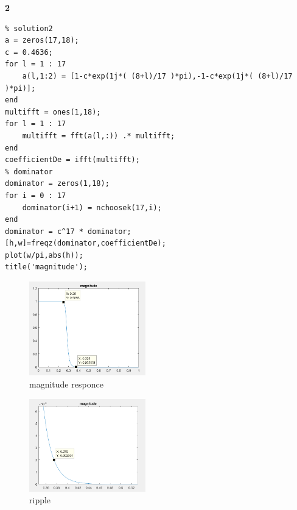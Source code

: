 \documentclass[twoside]{article}
\begin{document}
\thispagestyle{fancy} %
\noindent \textbf {2}
\begin{lstlisting}
% solution2
a = zeros(17,18);
c = 0.4636;
for l = 1 : 17
    a(l,1:2) = [1-c*exp(1j*( (8+l)/17 )*pi),-1-c*exp(1j*( (8+l)/17 )*pi)];
end
multifft = ones(1,18);
for l = 1 : 17
    multifft = fft(a(l,:)) .* multifft; 
end
coefficientDe = ifft(multifft);
% dominator
dominator = zeros(1,18);
for i = 0 : 17
    dominator(i+1) = nchoosek(17,i);
end
dominator = c^17 * dominator;
[h,w]=freqz(dominator,coefficientDe);
plot(w/pi,abs(h));
title('magnitude');
\end{lstlisting}
\begin{multicols}{2}
\begin{figure}[H]
   \centering
   \includegraphics[width = 0.45\textwidth]{./data/solution2.png}  
   \caption{magnitude responce}
\end{figure}
\begin{figure}[H]
   \centering
   \includegraphics[width = 0.45\textwidth]{./data/solution2error.png}  
   \caption{ripple}
\end{figure}
\end{multicols}
\end{document}

